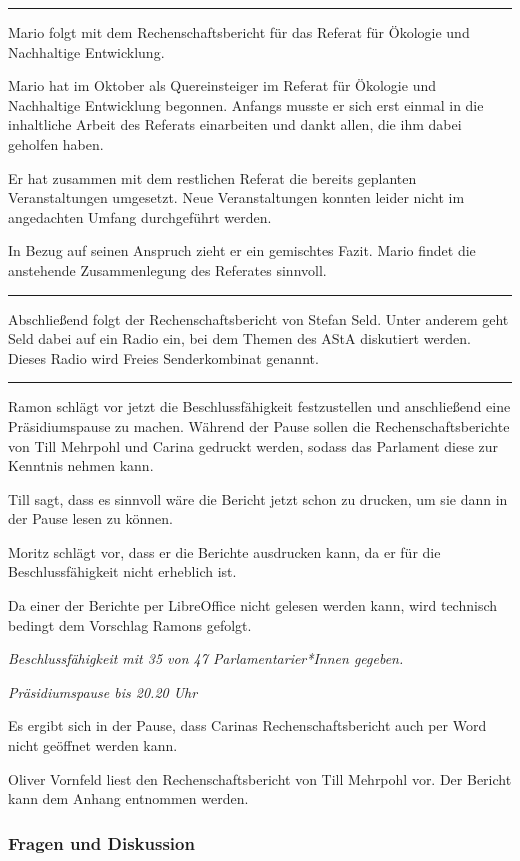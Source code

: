 \documentclass[ngerman,headheight=70pt]{scrartcl}
\begin{document}
    \hrule

    Mario folgt mit dem Rechenschaftsbericht für das Referat für Ökologie
    und Nachhaltige Entwicklung.

    Mario hat im Oktober als Quereinsteiger im Referat für Ökologie und
    Nachhaltige Entwicklung begonnen. Anfangs musste er sich erst einmal
    in die inhaltliche Arbeit des Referats einarbeiten und dankt allen,
    die ihm dabei geholfen haben.

    Er hat zusammen mit dem restlichen Referat die bereits geplanten Veranstaltungen
    umgesetzt. Neue Veranstaltungen konnten leider nicht im angedachten
    Umfang durchgeführt werden.

    In Bezug auf seinen Anspruch zieht er ein gemischtes Fazit. Mario findet
    die anstehende Zusammenlegung des Referates sinnvoll.

    \hrule

    Abschließend folgt der Rechenschaftsbericht von Stefan Seld.
    Unter anderem geht Seld dabei auf ein Radio ein, bei dem Themen des AStA
    diskutiert werden. Dieses Radio wird Freies Senderkombinat genannt.

    \hrule

    Ramon schlägt vor jetzt die Beschlussfähigkeit festzustellen und anschließend
    eine Präsidiumspause zu machen. Während der Pause sollen die Rechenschaftsberichte
    von Till Mehrpohl und Carina gedruckt werden, sodass das Parlament diese
    zur Kenntnis nehmen kann.

    Till sagt, dass es sinnvoll wäre die Bericht jetzt schon zu drucken, um sie
    dann in der Pause lesen zu können.

    Moritz schlägt vor, dass er die Berichte ausdrucken kann, da er für die
    Beschlussfähigkeit nicht erheblich ist.

    Da einer der Berichte per LibreOffice nicht gelesen werden kann,
    wird technisch bedingt dem Vorschlag Ramons gefolgt.

    \textit{Beschlussfähigkeit mit 35 von 47 Parlamentarier*Innen gegeben.}

    \textit{Präsidiumspause bis 20.20 Uhr}

    Es ergibt sich in der Pause, dass Carinas Rechenschaftsbericht
    auch per Word nicht geöffnet werden kann.

    Oliver Vornfeld liest den Rechenschaftsbericht von Till Mehrpohl vor.
    Der Bericht kann dem Anhang entnommen werden.

    \subsubsection{Fragen und Diskussion}
\end{document}

